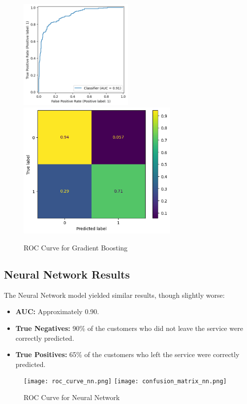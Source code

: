 \documentclass[12pt,titlepage]{article}
\begin{document}
\begin{figure}[h!]
    \centering
    \includegraphics[width=0.5\textwidth]{Figures/roc_curve_gb.png}
    \includegraphics[width=0.7\textwidth]{Figures/confusion_matrix_gb.png}
    \caption{ROC Curve for Gradient Boosting}
    \label{fig:roc_curve_gb}
\end{figure}


\subsection{Neural Network Results}
The Neural Network model yielded similar results, though slightly worse:
\begin{itemize}
    \item \textbf{AUC:} Approximately 0.90.
    \item \textbf{True Negatives:} 90\% of the customers who did not leave the service were correctly predicted.
    \item \textbf{True Positives:} 65\% of the customers who left the service were correctly predicted.
\end{itemize}

\begin{figure}[h!]
    \centering
    \texttt{[image: roc\_curve\_nn.png]}
    \texttt{[image: confusion\_matrix\_nn.png]}
    \caption{ROC Curve for Neural Network}
    \label{fig:roc_curve_nn}
\end{figure}
\end{document}
